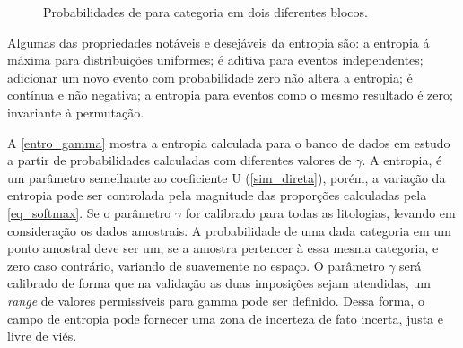 \begin{figure} 
\caption{Probabilidades de para categoria em dois diferentes blocos.} \label{entro_block}
     \centering
\end{figure}

Algumas das propriedades notáveis e desejáveis da entropia são: a entropia á máxima para distribuições uniformes; é aditiva para eventos independentes; adicionar um novo evento com probabilidade zero não altera a entropia; é contínua e não negativa; a entropia para eventos como o mesmo resultado é zero; invariante à permutação.

A \autoref{entro_gamma} mostra a entropia calculada para o banco de dados em estudo a partir de probabilidades calculadas com diferentes valores de $\gamma$. A entropia, é um parâmetro semelhante ao coeficiente U (\autoref{sim_direta}), porém, a variação da entropia pode ser controlada pela magnitude das proporções calculadas pela \autoref{eq_softmax}. Se o parâmetro $\gamma$ for calibrado para todas as litologias, levando em consideração os dados amostrais. A probabilidade de uma dada categoria em um ponto amostral deve ser um, se a amostra pertencer à essa mesma categoria, e zero caso contrário, variando de suavemente no espaço. O parâmetro $\gamma$ será calibrado de forma que na validação as duas imposições sejam atendidas, um \textit{range} de valores permissíveis para gamma pode ser definido. Dessa forma, o campo de entropia pode fornecer uma zona de incerteza de fato incerta, justa e livre de viés.

